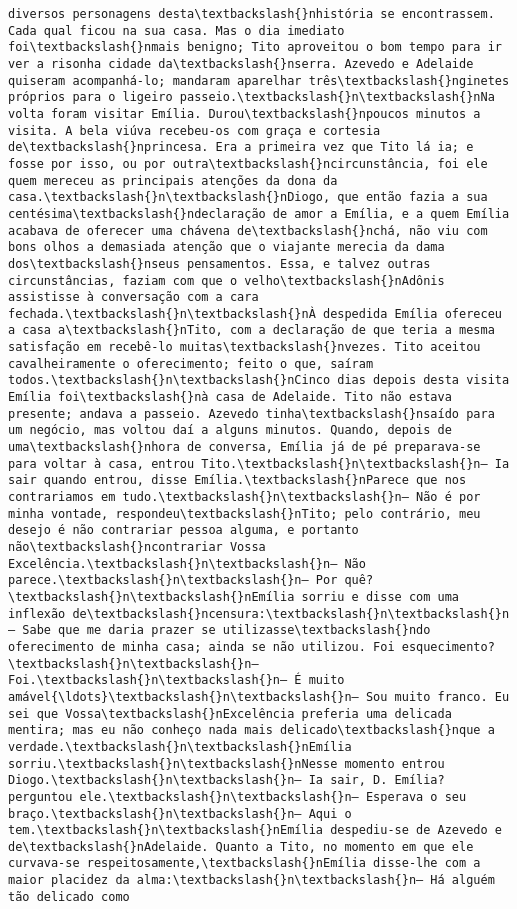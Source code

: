 \begin{Verbatim}[commandchars=\\\{\}]
diversos personagens desta\textbackslash{}nhistória se encontrassem. Cada qual ficou na sua casa. Mas o dia imediato foi\textbackslash{}nmais benigno; Tito aproveitou o bom tempo para ir ver a risonha cidade da\textbackslash{}nserra. Azevedo e Adelaide quiseram acompanhá-lo; mandaram aparelhar três\textbackslash{}nginetes próprios para o ligeiro passeio.\textbackslash{}n\textbackslash{}nNa volta foram visitar Emília. Durou\textbackslash{}npoucos minutos a visita. A bela viúva recebeu-os com graça e cortesia de\textbackslash{}nprincesa. Era a primeira vez que Tito lá ia; e fosse por isso, ou por outra\textbackslash{}ncircunstância, foi ele quem mereceu as principais atenções da dona da casa.\textbackslash{}n\textbackslash{}nDiogo, que então fazia a sua centésima\textbackslash{}ndeclaração de amor a Emília, e a quem Emília acabava de oferecer uma chávena de\textbackslash{}nchá, não viu com bons olhos a demasiada atenção que o viajante merecia da dama dos\textbackslash{}nseus pensamentos. Essa, e talvez outras circunstâncias, faziam com que o velho\textbackslash{}nAdônis assistisse à conversação com a cara fechada.\textbackslash{}n\textbackslash{}nÀ despedida Emília ofereceu a casa a\textbackslash{}nTito, com a declaração de que teria a mesma satisfação em recebê-lo muitas\textbackslash{}nvezes. Tito aceitou cavalheiramente o oferecimento; feito o que, saíram todos.\textbackslash{}n\textbackslash{}nCinco dias depois desta visita Emília foi\textbackslash{}nà casa de Adelaide. Tito não estava presente; andava a passeio. Azevedo tinha\textbackslash{}nsaído para um negócio, mas voltou daí a alguns minutos. Quando, depois de uma\textbackslash{}nhora de conversa, Emília já de pé preparava-se para voltar à casa, entrou Tito.\textbackslash{}n\textbackslash{}n— Ia sair quando entrou, disse Emília.\textbackslash{}nParece que nos contrariamos em tudo.\textbackslash{}n\textbackslash{}n— Não é por minha vontade, respondeu\textbackslash{}nTito; pelo contrário, meu desejo é não contrariar pessoa alguma, e portanto não\textbackslash{}ncontrariar Vossa Excelência.\textbackslash{}n\textbackslash{}n— Não parece.\textbackslash{}n\textbackslash{}n— Por quê?\textbackslash{}n\textbackslash{}nEmília sorriu e disse com uma inflexão de\textbackslash{}ncensura:\textbackslash{}n\textbackslash{}n— Sabe que me daria prazer se utilizasse\textbackslash{}ndo oferecimento de minha casa; ainda se não utilizou. Foi esquecimento?\textbackslash{}n\textbackslash{}n— Foi.\textbackslash{}n\textbackslash{}n— É muito amável{\ldots}\textbackslash{}n\textbackslash{}n— Sou muito franco. Eu sei que Vossa\textbackslash{}nExcelência preferia uma delicada mentira; mas eu não conheço nada mais delicado\textbackslash{}nque a verdade.\textbackslash{}n\textbackslash{}nEmília sorriu.\textbackslash{}n\textbackslash{}nNesse momento entrou Diogo.\textbackslash{}n\textbackslash{}n— Ia sair, D. Emília? perguntou ele.\textbackslash{}n\textbackslash{}n— Esperava o seu braço.\textbackslash{}n\textbackslash{}n— Aqui o tem.\textbackslash{}n\textbackslash{}nEmília despediu-se de Azevedo e de\textbackslash{}nAdelaide. Quanto a Tito, no momento em que ele curvava-se respeitosamente,\textbackslash{}nEmília disse-lhe com a maior placidez da alma:\textbackslash{}n\textbackslash{}n— Há alguém tão delicado como 
\end{Verbatim}
